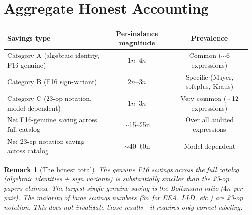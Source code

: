 \documentclass[11pt]{article}
\newtheorem{remark}[theorem]{Remark}
\begin{document}
\section{Aggregate Honest Accounting}

\begin{center}
\begin{tabular}{lcc}
\toprule
Savings type & Per-instance magnitude & Prevalence \\
\midrule
Category A (algebraic identity, F16-genuine) & $1n$--$4n$ & Common ($\sim$6 expressions) \\
Category B (F16 sign-variant) & $2n$--$3n$ & Specific (Mayer, softplus, Kraus) \\
Category C (23-op notation, model-dependent) & $1n$--$3n$ & Very common ($\sim$12 expressions) \\
\midrule
Net F16-genuine saving across full catalog & $\sim$15--25n & Over all audited expressions \\
Net 23-op notation saving across catalog & $\sim$40--60n & Model-dependent \\
\bottomrule
\end{tabular}
\end{center}

\begin{remark}[The honest total]
The genuine F16 savings across the full catalog (algebraic identities + sign variants)
is substantially smaller than the 23-op papers claimed.
The largest single genuine saving is the Boltzmann ratio ($4n$ per pair).
The majority of large savings numbers ($3n$ for EEA, LLD, etc.) are 23-op notation.
This does not invalidate those results---it requires only correct labeling.
\end{remark}
\end{document}
